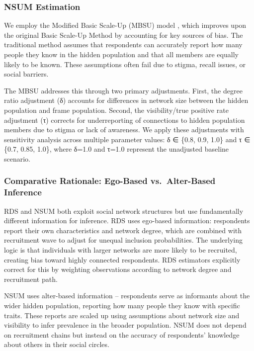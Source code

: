 \documentclass[
  12pt,
  letterpaper,
  DIV=11,
  numbers=noendperiod]{scrartcl}
\theoremstyle{plain}
\theoremstyle{definition}
\begin{document}
\subsubsection{NSUM Estimation}\label{nsum-estimation}

We employ the Modified Basic Scale-Up (MBSU) model
\autocite{feeh16-generalizing}, which improves upon the original Basic
Scale-Up Method by accounting for key sources of bias. The traditional
method assumes that respondents can accurately report how many people
they know in the hidden population and that all members are equally
likely to be known. These assumptions often fail due to stigma, recall
issues, or social barriers.

The MBSU addresses this through two primary adjustments. First, the
degree ratio adjustment (δ) accounts for differences in network size
between the hidden population and frame population. Second, the
visibility/true positive rate adjustment (τ) corrects for underreporting
of connections to hidden population members due to stigma or lack of
awareness. We apply these adjustments with sensitivity analysis across
multiple parameter values: δ ∈ \{0.8, 0.9, 1.0\} and τ ∈ \{0.7, 0.85,
1.0\}, where δ=1.0 and τ=1.0 represent the unadjusted baseline scenario.

\subsubsection{Comparative Rationale: Ego-Based vs.~Alter-Based
Inference}\label{comparative-rationale-ego-based-vs.-alter-based-inference}

RDS and NSUM both exploit social network structures but use
fundamentally different information for inference. RDS uses ego-based
information: respondents report their own characteristics and network
degree, which are combined with recruitment wave to adjust for unequal
inclusion probabilities. The underlying logic is that individuals with
larger networks are more likely to be recruited, creating bias toward
highly connected respondents. RDS estimators explicitly correct for this
by weighting observations according to network degree and recruitment
path.

NSUM uses alter-based information -- respondents serve as informants
about the wider hidden population, reporting how many people they know
with specific traits. These reports are scaled up using assumptions
about network size and visibility to infer prevalence in the broader
population. NSUM does not depend on recruitment chains but instead on
the accuracy of respondents' knowledge about others in their social
circles.
\end{document}

